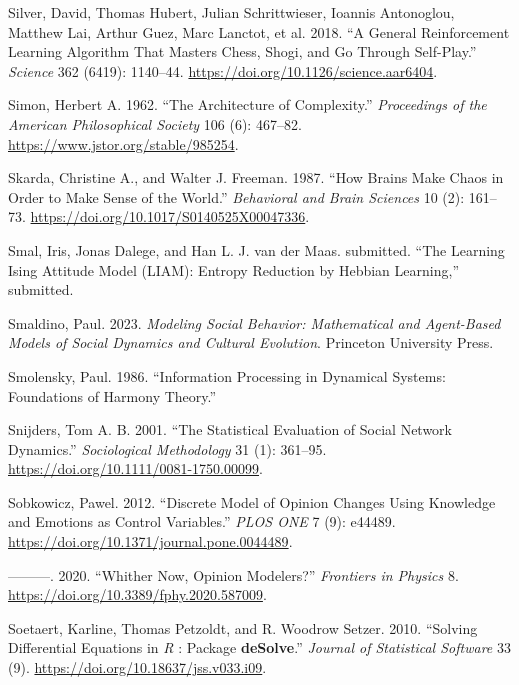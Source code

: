 \documentclass[
  a4paper,
  DIV=11,
  numbers=noendperiod,
  oneside]{scrreprt}
\newlength{\cslhangindent}
\newenvironment{CSLReferences}[2] %
 {\begin{list}{}{%
  \setlength{\itemindent}{0pt}
  \setlength{\leftmargin}{0pt}
  \setlength{\parsep}{0pt}
  \ifodd #1
   \setlength{\leftmargin}{\cslhangindent}
   \setlength{\itemindent}{-1\cslhangindent}
  \fi
  \setlength{\itemsep}{#2\baselineskip}}}
 {\end{list}}
\begin{document}
\begin{CSLReferences}{1}{0}
Silver, David, Thomas Hubert, Julian Schrittwieser, Ioannis Antonoglou,
Matthew Lai, Arthur Guez, Marc Lanctot, et al. 2018. {``A General
Reinforcement Learning Algorithm That Masters Chess, Shogi, and {Go}
Through Self-Play.''} \emph{Science} 362 (6419): 1140--44.
\url{https://doi.org/10.1126/science.aar6404}.

Simon, Herbert A. 1962. {``The Architecture of Complexity.''}
\emph{Proceedings of the American Philosophical Society} 106 (6):
467--82. \url{https://www.jstor.org/stable/985254}.

Skarda, Christine A., and Walter J. Freeman. 1987. {``How Brains Make
Chaos in Order to Make Sense of the World.''} \emph{Behavioral and Brain
Sciences} 10 (2): 161--73.
\url{https://doi.org/10.1017/S0140525X00047336}.

Smal, Iris, Jonas Dalege, and Han L. J. van der Maas. submitted. {``The
{Learning Ising Attitude Model} ({LIAM}): {Entropy Reduction} by
{Hebbian Learning},''} submitted.

Smaldino, Paul. 2023. \emph{Modeling Social Behavior: Mathematical and
Agent-Based Models of Social Dynamics and Cultural Evolution}. Princeton
University Press.

Smolensky, Paul. 1986. {``Information {Processing} in {Dynamical
Systems}: {Foundations} of {Harmony Theory}.''}

Snijders, Tom A. B. 2001. {``The {Statistical Evaluation} of {Social
Network Dynamics}.''} \emph{Sociological Methodology} 31 (1): 361--95.
\url{https://doi.org/10.1111/0081-1750.00099}.

Sobkowicz, Pawel. 2012. {``Discrete {Model} of {Opinion Changes Using
Knowledge} and {Emotions} as {Control Variables}.''} \emph{PLOS ONE} 7
(9): e44489. \url{https://doi.org/10.1371/journal.pone.0044489}.

---------. 2020. {``Whither {Now}, {Opinion Modelers}?''}
\emph{Frontiers in Physics} 8.
\url{https://doi.org/10.3389/fphy.2020.587009}.

Soetaert, Karline, Thomas Petzoldt, and R. Woodrow Setzer. 2010.
{``Solving Differential Equations in {\emph{R}} : Package
{\textbf{deSolve}}.''} \emph{Journal of Statistical Software} 33 (9).
\url{https://doi.org/10.18637/jss.v033.i09}.


\end{CSLReferences}
\end{document}
